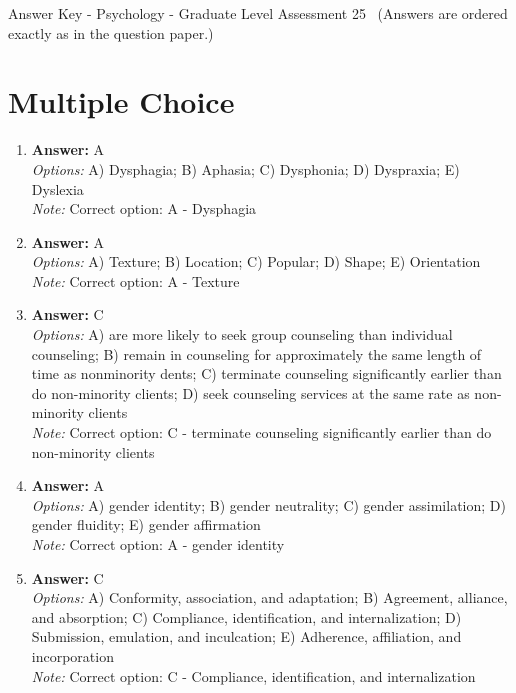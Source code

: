 \documentclass[12pt]{article}
\begin{document}
\begin{center}
Answer Key - Psychology - Graduate Level Assessment 25 \
\small (Answers are ordered exactly as in the question paper.)
\end{center}

\section*{Multiple Choice}
\begin{enumerate}[label=\arabic*.]
\item \textbf{Answer:} A
\\ \textit{Options:} A) Dysphagia; B) Aphasia; C) Dysphonia; D) Dyspraxia; E) Dyslexia
\\ \textit{Note:} Correct option: A - Dysphagia
\item \textbf{Answer:} A
\\ \textit{Options:} A) Texture; B) Location; C) Popular; D) Shape; E) Orientation
\\ \textit{Note:} Correct option: A - Texture
\item \textbf{Answer:} C
\\ \textit{Options:} A) are more likely to seek group counseling than individual counseling; B) remain in counseling for approximately the same length of time as nonminority dents; C) terminate counseling significantly earlier than do non-minority clients; D) seek counseling services at the same rate as non-minority clients
\\ \textit{Note:} Correct option: C - terminate counseling significantly earlier than do non-minority clients
\item \textbf{Answer:} A
\\ \textit{Options:} A) gender identity; B) gender neutrality; C) gender assimilation; D) gender fluidity; E) gender affirmation
\\ \textit{Note:} Correct option: A - gender identity
\item \textbf{Answer:} C
\\ \textit{Options:} A) Conformity, association, and adaptation; B) Agreement, alliance, and absorption; C) Compliance, identification, and internalization; D) Submission, emulation, and inculcation; E) Adherence, affiliation, and incorporation
\\ \textit{Note:} Correct option: C - Compliance, identification, and internalization
\end{enumerate}
\end{document}
